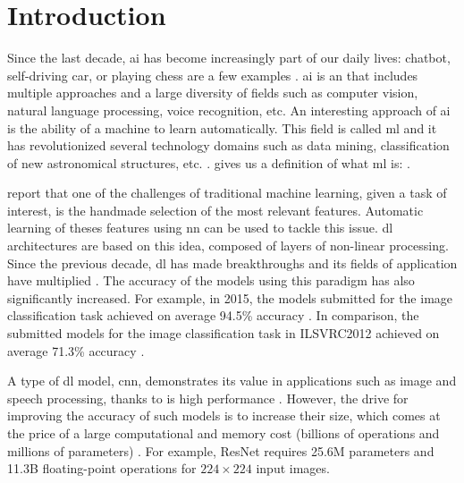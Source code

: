 \chapter*{Introduction} \label{chap:intr}
%
%
Since the last decade, \acrfull{ai} has become increasingly part of our daily lives: chatbot, self-driving car, or playing chess are a few examples \cite{russell_artificial_2009}. \acrshort{ai} is an  that includes multiple approaches and a large diversity of fields such as computer vision, natural language processing, voice recognition, etc. An interesting approach of \acrshort{ai} is the ability of a machine to learn automatically. This field is called \acrfull{ml} and it has revolutionized several technology domains such as data mining, classification of new astronomical structures, etc. \cite{alom_history_2018, mitchell_machine_1997}. \textcite{mitchell_machine_1997} gives us a definition of what \acrshort{ml} is: .

\textcite{arnold_introduction_2011} report that one of the challenges of traditional machine learning, given a task of interest, is the handmade selection of the most relevant features. Automatic learning of theses features using \acrfull{nn} can be used to tackle this issue. \acrfull{dl} architectures are based on this idea, composed of layers of non-linear processing. Since the previous decade, \acrshort{dl} has made breakthroughs and its fields of application have multiplied \cite{wason_deep_2018}. The accuracy of the models using this paradigm has also significantly increased. For example, in 2015, the models submitted for the image classification task achieved on average 94.5\% accuracy \cite{russakovsky_imagenet_2015}. In comparison, the submitted models for the image classification task in ILSVRC2012 achieved on average 71.3\% accuracy \cite{noauthor_imagenet_nodate}.

A type of \acrshort{dl} model, \acrfull{cnn}, demonstrates its value in applications such as image and speech processing, thanks to is high performance \cite{shawahna_fpga-based_2019}. However, the drive for improving the accuracy of such models is to increase their size, which comes at the price of a large computational and memory cost (billions of operations and millions of parameters) \cite{szegedy_going_2014, khan_survey_2020}. For example, ResNet \cite{he_deep_2015} requires 25.6M parameters and 11.3B floating-point operations for $224 \times 224$ input images.


